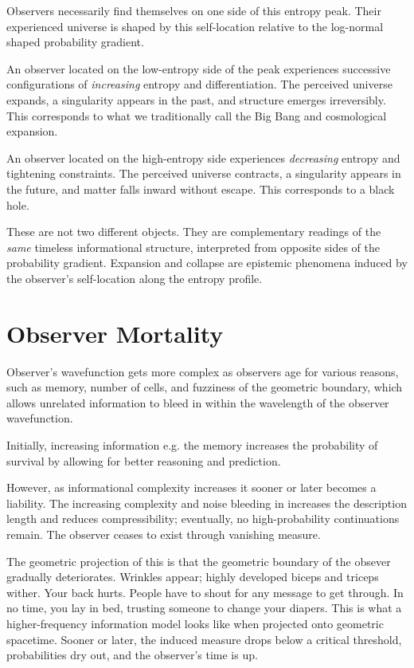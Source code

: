 Observers necessarily find themselves on one side of this entropy peak.
Their experienced universe is shaped by this self-location relative to the log-normal shaped probability gradient.

An observer located on the low-entropy side of the peak experiences successive configurations of \emph{increasing} entropy and differentiation.
The perceived universe expands, a singularity appears in the past, and structure emerges irreversibly. This corresponds to what we traditionally call the Big Bang and cosmological expansion.

An observer located on the high-entropy side experiences \emph{decreasing} entropy and tightening constraints.
The perceived universe contracts, a singularity appears in the future, and matter falls inward without escape.
This corresponds to a black hole.

These are not two different objects. They are complementary readings of the \emph{same} timeless informational structure,
interpreted from opposite sides of the probability gradient.
Expansion and collapse are epistemic phenomena induced by the observer’s self-location along the entropy profile.


\section{Observer Mortality}

Observer's wavefunction gets more complex as observers age for various reasons, such as memory, number of cells, and
fuzziness of the geometric boundary, which allows unrelated information to bleed in within the wavelength of
the observer wavefunction.

Initially, increasing information e.g. the memory increases the probability of survival by allowing for better reasoning and prediction.

However, as informational complexity increases it sooner or later becomes a liability.
The increasing complexity and noise bleeding in increases the description length and reduces compressibility;
eventually, no high-probability continuations remain. The observer ceases to exist through vanishing measure.

The geometric projection of this is that the geometric boundary of the obsever gradually deteriorates.
Wrinkles appear; highly developed biceps and triceps wither.
Your back hurts. People have to shout for any message to get through.
In no time, you lay in bed, trusting someone to change your diapers.
This is what a higher-frequency information model looks like when projected onto geometric spacetime.
Sooner or later, the induced measure drops below a critical threshold, probabilities dry out, and the observer's time is up.

